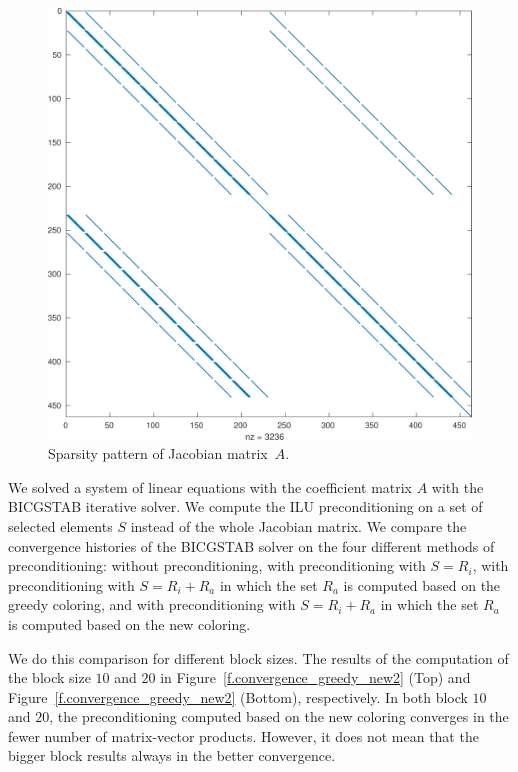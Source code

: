 \documentclass[12pt, twoside,a4paper,toc=bibliography]{scrbook}
\begin{document}
\begin{figure}%
	\footnotesize
	\centering
         \includegraphics[width=0.6\linewidth]{co2_jac}
\caption{Sparsity pattern of Jacobian matrix~$A$.}%
\label{f:geophysik_J_matrices}
\end{figure}

We solved a system of linear equations with the
coefficient matrix $A$ with the BICGSTAB iterative solver.
We compute the ILU preconditioning on a set of selected elements $S$
instead of the whole Jacobian matrix. 
We compare the convergence histories of the BICGSTAB solver 
on the four different methods of preconditioning:
without preconditioning,
with preconditioning with $S=R_i$,
with preconditioning with $S=R_i + R_a$ in which 
the set $R_a$ is computed based on the greedy coloring,
and with preconditioning with $S=R_i + R_a$ in which 
the set $R_a$ is computed based on the new coloring.

We do this comparison for different block sizes.
The results of the computation of the block size
$10$ and $20$ in
Figure~\ref{f.convergence_greedy_new2} (Top) and
Figure~\ref{f.convergence_greedy_new2} (Bottom), respectively.
In both block $10$ and $20$, the preconditioning computed based
on the new coloring converges in the fewer number of matrix-vector products.
However, it does not mean that the bigger block results always in the 
better convergence.
\end{document}
